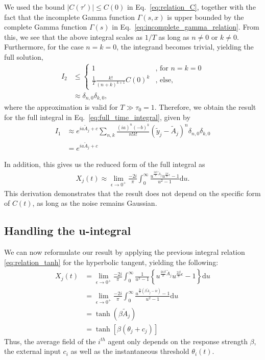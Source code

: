 \documentclass[reprint,amsmath,amssymb,aps]{revtex4-2}
\begin{document}
We used the bound $|C(\tau')| \leq C(0)$ in Eq.~\eqref{eq:relation_C}, together with the fact that the incomplete Gamma function $\Gamma(s,x)$ is upper bounded by the complete Gamma function $\Gamma(s)$ in Eq.~\eqref{eq:incomplete_gamma_relation}. From this, we see that the above integral scales as $1/T$ as long as $n \neq 0$ or $k \neq 0$. Furthermore, for the case $n = k = 0$, the integrand becomes trivial, yielding the full solution,
\begin{align*}
    I_2
    &\leq
    \begin{cases}
    1
    &\text{,     for $n=k=0$}\\
    \frac{1}{T}
    \frac{k!}{(n+k)^{k+1}} C(0)^k
    &\text{,     else,}
    \end{cases}
    \nonumber \\
    &\approx
    \delta_{n,0} \delta_{k,0},
\end{align*}
where the approximation is valid for $T \gg \tau_0 = 1$. Therefore, we obtain the result for the full integral in Eq.~\eqref{eq:full_time_integral}, given by
\begin{align}
    I_1
    &\approx
    e^{ia\tilde{A}_j+c} \sum_{n,k} \frac{(ia)^n (-b)^k}{n! k!}
    (\tilde{y}_j-\tilde{A}_j)^n 
    \delta_{n,0}
    \delta_{k,0} \nonumber \\
    &= 
    e^{ia\tilde{A}_j+c}
\end{align}

In addition, this gives us the reduced form of the full integral as
\begin{align*}
     X_j(t)
    \approx
    \lim_{\epsilon\rightarrow 0^+}
    \frac{-2i}{\pi} 
    \int_0^\infty
    \frac{
    u^{\frac{2i\beta}{\pi}\tilde{A}_j}
    u^{\frac{2\beta}{\pi}\epsilon}
    -1}{u^2-1}
    \mathrm{d}u.
\end{align*}
This derivation demonstrates that the result does not depend on the specific form of $C(t)$, as long as the noise remains Gaussian.

\subsection{Handling the u-integral}
We can now reformulate our result by applying the previous integral relation \eqref{eq:relation_tanh} for the hyperbolic tangent, yielding the following:
\begin{align*}
    X_j(t)
    &=    \lim_{\epsilon\rightarrow 0^+}
    \frac{-2i}{\pi} 
    \int_0^\infty
    \frac{1}{u^2-1}
    \left\{
    u^{\frac{2i\beta}{\pi}\tilde{A}_j}
    u^{\frac{2\beta}{\pi}\epsilon}
    -1
    \right\}
    \mathrm{d}u  \\
    &=    \lim_{\epsilon\rightarrow 0^+}
    \frac{-2i}{\pi} 
    \int_0^\infty
    \frac{
    u^{\frac{2i}{\pi}\left(\beta\tilde{A}_j-i\epsilon\right)
    }
    -1
    }{u^2-1}
    \mathrm{d}u \\
    &=
    \tanh(\beta \tilde{A}_j)  \\
    &=
    \tanh\left[\beta \left(\theta_j + c_j\right)\right]
\end{align*}
Thus, the average field of the $i^{th}$ agent only depends on the response strength $\beta$, the external input $c_i$ as well as the instantaneous threshold $\theta_i(t)$. 
\end{document}
